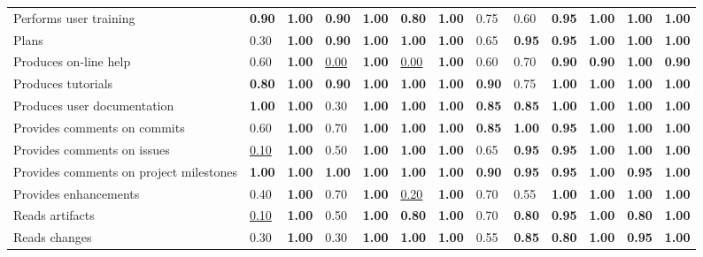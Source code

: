 \begin{tabular}{lllllllllllll}
Performs user training & \textbf{0.90} & \textbf{1.00} & \textbf{0.90} & \textbf{1.00} & \textbf{0.80} & \textbf{1.00} & 0.75 & 0.60 & \textbf{0.95} & \textbf{1.00} & \textbf{1.00} & \textbf{1.00} \\
Plans & 0.30 & \textbf{1.00} & \textbf{0.90} & \textbf{1.00} & \textbf{1.00} & \textbf{1.00} & 0.65 & \textbf{0.95} & \textbf{0.95} & \textbf{1.00} & \textbf{1.00} & \textbf{1.00} \\
Produces on-line help & 0.60 & \textbf{1.00} & \underline{0.00} & \textbf{1.00} & \underline{0.00} & \textbf{1.00} & 0.60 & 0.70 & \textbf{0.90} & \textbf{0.90} & \textbf{1.00} & \textbf{0.90} \\
Produces tutorials & \textbf{0.80} & \textbf{1.00} & \textbf{0.90} & \textbf{1.00} & \textbf{1.00} & \textbf{1.00} & \textbf{0.90} & 0.75 & \textbf{1.00} & \textbf{1.00} & \textbf{1.00} & \textbf{1.00} \\
Produces user documentation & \textbf{1.00} & \textbf{1.00} & 0.30 & \textbf{1.00} & \textbf{1.00} & \textbf{1.00} & \textbf{0.85} & \textbf{0.85} & \textbf{1.00} & \textbf{1.00} & \textbf{1.00} & \textbf{1.00} \\
Provides comments on commits & 0.60 & \textbf{1.00} & 0.70 & \textbf{1.00} & \textbf{1.00} & \textbf{1.00} & \textbf{0.85} & \textbf{1.00} & \textbf{0.95} & \textbf{1.00} & \textbf{1.00} & \textbf{1.00} \\
Provides comments on issues & \underline{0.10} & \textbf{1.00} & 0.50 & \textbf{1.00} & \textbf{1.00} & \textbf{1.00} & 0.65 & \textbf{0.95} & \textbf{0.95} & \textbf{1.00} & \textbf{1.00} & \textbf{1.00} \\
Provides comments on project milestones & \textbf{1.00} & \textbf{1.00} & \textbf{1.00} & \textbf{1.00} & \textbf{1.00} & \textbf{1.00} & \textbf{0.90} & \textbf{0.95} & \textbf{0.95} & \textbf{1.00} & \textbf{0.95} & \textbf{1.00} \\
Provides enhancements & 0.40 & \textbf{1.00} & 0.70 & \textbf{1.00} & \underline{0.20} & \textbf{1.00} & 0.70 & 0.55 & \textbf{1.00} & \textbf{1.00} & \textbf{1.00} & \textbf{1.00} \\
Reads artifacts & \underline{0.10} & \textbf{1.00} & 0.50 & \textbf{1.00} & \textbf{0.80} & \textbf{1.00} & 0.70 & \textbf{0.80} & \textbf{0.95} & \textbf{1.00} & \textbf{0.80} & \textbf{1.00} \\
Reads changes & 0.30 & \textbf{1.00} & 0.30 & \textbf{1.00} & \textbf{1.00} & \textbf{1.00} & 0.55 & \textbf{0.85} & \textbf{0.80} & \textbf{1.00} & \textbf{0.95} & \textbf{1.00} \\

\end{tabular}
